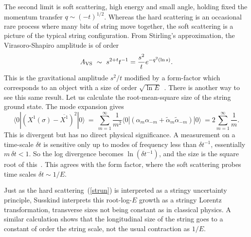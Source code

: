 The second limit is soft scattering, high energy and small angle,
holding fixed 
the momentum transfer $q \sim 
(-t)^{1/2}$.  Whereas the hard scattering is an
occasional rare process where many bits of string move together,
the soft scattering is a picture of the typical string configuration.
From
Stirling's approximation, the Virasoro-Shapiro amplitude is of order
\begin{equation}
A_{\rm VS}\ \sim\ s^{2 + t} t^{-1} = \frac{s^2}{t} e^{-q^2 (\ln s)}.
\end{equation} 
This is the gravitational amplitude $s^2/t$ modified by a form-factor
which corresponds to an object with a size of order $\sqrt{\ln
E}$~\cite{Slor}. There is another way to see this same result.  Let
us calculate the root-mean-square size of the string ground state. 
The mode expansion gives
\begin{equation}
\langle 0 | (X^1(\sigma) - \overline {X^1})^2 | 0  \rangle
\ =\ \sum_{m = 1}^\infty \frac{1}{m^2}
\langle 0 | (\alpha_m \alpha_{-m} + \tilde\alpha_m \tilde\alpha_{-m})
| 0 \rangle\ = 2 \sum_{m = 1}^\infty \frac{1}{m}.
\end{equation}
This is divergent but has no direct physical significance.  A
measurement on a time-scale $\delta t$ is sensitive only up to modes
of frequency less than $\delta t^{-1}$,
essentially $m\, \delta t < 1$.
So the log divergence becomes $\ln (\delta t^{-1})$, and the size is
the square root of this~\cite{Slor}.  This agrees with the form
factor, where the soft scattering probes time scales $\delta t \sim
{1/E}$.

Just as the hard scattering~(\ref{strun}) is interpreted as a
stringy uncertainty principle, Susskind interprets this root-log-$E$
growth as a stringy Lorentz transformation, transverse sizes not
being
constant as in classical physics.  A similar calculation shows that 
the longitudinal size of the string goes to a constant of order the
string scale, not the usual contraction as $1/E$.


